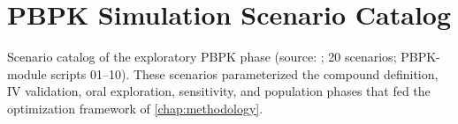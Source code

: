 \chapter{PBPK Simulation Scenario Catalog}
\label{chap:app-scenarios}

Scenario catalog of the exploratory PBPK phase (source:   ; 20 scenarios; PBPK-module scripts 01--10). These scenarios parameterized the compound definition, IV validation, oral exploration, sensitivity, and population phases that fed the optimization framework of \cref{chap:methodology}.

